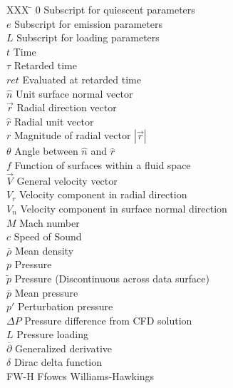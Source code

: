 \documentclass[]{aiaa-tc}%
\begin{document}
\begin{multicols}{2}
\begin{tabbing}
  XXX \= \kill%
  $0$                 \> Subscript for quiescent parameters \\
  $e$                 \> Subscript for emission parameters \\
  $L$                 \> Subscript for loading parameters \\
  $t$                 \> Time \\
  $\tau$              \> Retarded time \\
  $ret$               \> Evaluated at retarded time \\
  $\hat{n}$           \> Unit surface normal vector \\
  $\vec{r}$           \> Radial direction vector \\
  $\hat{r}$           \> Radial unit vector \\
  $r$                 \> Magnitude of radial vector $|\vec{r}|$ \\
  $\theta$            \> Angle between $\hat{n}$ and $\hat{r}$ \\
  $f$                 \> Function of surfaces within a fluid space \\
  $\vec{V}$           \> General velocity vector \\
  $V_r$               \> Velocity component in radial direction \\
  $V_n$               \> Velocity component in surface normal direction \\
  $M$                 \> Mach number \\
  $c$                 \> Speed of Sound\\
  $\overline{\rho}$   \> Mean density \\
  $p$                 \> Pressure  \\
  $\widetilde{p}$     \> Pressure (Discontinuous across data surface)  \\
  $\overline{p}$      \> Mean pressure \\
  $p'$                \> Perturbation pressure \\
  $\Delta P$          \> Pressure difference from CFD solution \\
  $L$                 \> Pressure loading \\
  $\overline{\partial}$ \> Generalized derivative \\
  $\delta$            \> Dirac delta function \\
  \scriptsize{FW-H}   \> Ffowcs Williams-Hawkings\\






\end{tabbing}

\end{multicols}
\end{document}
